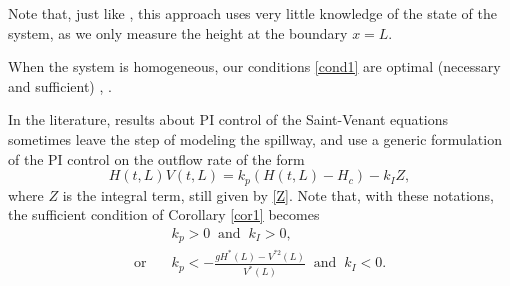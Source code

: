 {Note that, just like \cite{BastinCoronPI}, this approach uses very little knowledge of the state of the system, as we only measure the height at the boundary $x=L$.}

\begin{rmk}
{When the system is homogeneous, our conditions \eqref{cond1} are optimal (necessary and sufficient) \cite{BastinCoronTamasoiu2015}, \cite[\S 2.2.4.1]{BastinCoron1D}.}
\end{rmk}

\begin{rmk}
In the literature, results about PI control of the Saint-Venant equations sometimes leave the step of modeling the spillway, and use a generic formulation of the PI control on the outflow rate of the form\vspace*{-3pt}
\begin{equation*}
H(t,L)V(t,L)=k_{{p}}(H(t,L)-H_{c})-k_{{I}}Z,
\end{equation*}
where $Z$ is the integral term, still given by \eqref{Z}.
Note that, with these notations, the sufficient condition of Corollary \ref{cor1} becomes\vspace*{-3pt}
\begin{equation*}
\begin{split}
&k_{p}>0\;\;\text{and}\;\;k_{I}>0,\\
\text{or}\quad&k_{p}<-\frac{gH^{*}(L)-V^{*2}(L)}{V^{*}(L)}\;\;\text{and}\;\;k_{I}<0.
\end{split}
\end{equation*}
\end{rmk}

